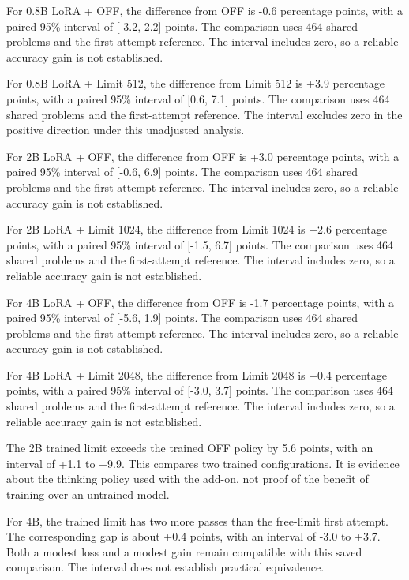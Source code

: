 \documentclass[11pt,letterpaper]{article}
\begin{document}
For 0.8B LoRA + OFF, the difference from OFF is -0.6 percentage points, with a paired 95\% interval of [-3.2, 2.2] points. The comparison uses 464 shared problems and the first-attempt reference. The interval includes zero, so a reliable accuracy gain is not established.\par

For 0.8B LoRA + Limit  512, the difference from Limit 512 is +3.9 percentage points, with a paired 95\% interval of [0.6, 7.1] points. The comparison uses 464 shared problems and the first-attempt reference. The interval excludes zero in the positive direction under this unadjusted analysis.\par

For 2B LoRA + OFF, the difference from OFF is +3.0 percentage points, with a paired 95\% interval of [-0.6, 6.9] points. The comparison uses 464 shared problems and the first-attempt reference. The interval includes zero, so a reliable accuracy gain is not established.\par

For 2B LoRA + Limit  1024, the difference from Limit 1024 is +2.6 percentage points, with a paired 95\% interval of [-1.5, 6.7] points. The comparison uses 464 shared problems and the first-attempt reference. The interval includes zero, so a reliable accuracy gain is not established.\par

For 4B LoRA + OFF, the difference from OFF is -1.7 percentage points, with a paired 95\% interval of [-5.6, 1.9] points. The comparison uses 464 shared problems and the first-attempt reference. The interval includes zero, so a reliable accuracy gain is not established.\par

For 4B LoRA + Limit  2048, the difference from Limit 2048 is +0.4 percentage points, with a paired 95\% interval of [-3.0, 3.7] points. The comparison uses 464 shared problems and the first-attempt reference. The interval includes zero, so a reliable accuracy gain is not established.\par

The 2B trained limit exceeds the trained OFF policy by 5.6 points, with an interval of +1.1 to +9.9. This compares two trained configurations. It is evidence about the thinking policy used with the add-on, not proof of the benefit of training over an untrained model.\par

For 4B, the trained limit has two more passes than the free-limit first attempt. The corresponding gap is about +0.4 points, with an interval of -3.0 to +3.7. Both a modest loss and a modest gain remain compatible with this saved comparison. The interval does not establish practical equivalence.\par
\end{document}
